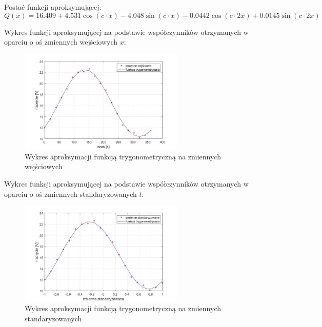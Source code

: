 \documentclass[a4paper, 12pt]{mwart}
\begin{document}
				Postać funkcji aproksymującej:
				$$Q(x) = 16.409 + 4.531 \cos\left(c\cdot x\right) - 4.048 \sin \left(c\cdot x\right)
				- 0.0442 \cos \left(c\cdot 2x\right) + 0.0145 \sin \left(c \cdot 2x\right)$$

				Wykres funkcji aproksymującej na podstawie współczynników otrzymanych w oparciu
				o oś zmiennych wejściowych $x$:
				\begin{figure}[h]
					\begin{center}
						\includegraphics[width = 0.7\textwidth]{graphs/6-n.jpg}
						\caption{Wykres aproksymacji funkcją trygonometryczną na zmiennych wejściowych}
						\label{fig:6n}
					\end{center}
				\end{figure}
			\newpage
				Wykres funkcji aproksymującej na podstawie współczynników otrzymanych w oparciu
				o oś zmiennych standaryzowanych $t$:
				\begin{figure}[h]
					\begin{center}
						\includegraphics[width = 0.7\textwidth]{graphs/6-s.jpg}
						\caption{Wykres aproksymacji funkcją trygonometryczną na zmiennych standaryzowanych}
						\label{fig:6s}
					\end{center}
				\end{figure}
\end{document}
